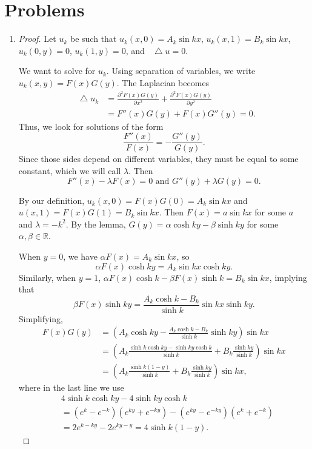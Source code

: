 \documentclass[oneside]{article}
\newcommand*\Laplace{\mathop{}\!\mathbin\bigtriangleup}
\newcommand\bbR{\mathbb{R}}
\begin{document}
  \section{Problems}
  \begin{enumerate}[label=\textbf{\arabic*.}]
    \item
    \begin{proof}
    Let $u_k$ be such that $u_k(x, 0) = A_k\sin kx$, $u_k(x, 1) = B_k\sin kx$,
    $u_k(0, y) = 0$, $u_k(1, y) = 0$, and $\Laplace u = 0$.

    We want to solve for $u_k$. Using separation of variables, we write
    $u_k(x, y) = F(x)G(y)$. The Laplacian becomes \begin{align*}
      \Laplace u_k
      &= \frac{\partial^2F(x)G(y)}{\partial x^2}
         + \frac{\partial^2F(x)G(y)}{\partial y^2} \\
      &= F''(x)G(y) + F(x)G''(y) = 0 \text{.}
    \end{align*} Thus, we look for solutions of the form\[
      \frac{F''(x)}{F(x)} = - \frac{G''(y)}{G(y)} \text{.}
    \] Since those sides depend on different variables, they must be equal to some
    constant, which we will call $\lambda$. Then \[
      F''(x) - \lambda F(x) = 0 \text{ and } G''(y) + \lambda G(y) = 0 \text{.}
    \]

    By our definition, $u_k(x, 0) = F(x)G(0) = A_k\sin kx$ and
    $u(x, 1) = F(x)G(1) = B_k\sin kx$. Then $F(x) = a\sin kx$ for some $a$ and
    $\lambda = -k^2$. By the lemma, $G(y) = \alpha\cosh ky - \beta\sinh ky$ for
    some $\alpha, \beta \in \bbR$.

    When $y = 0$, we have $\alpha F(x) = A_k\sin kx$, so\[
      \alpha F(x)\cosh ky = A_k\sin kx \cosh ky \text{.}
    \] Similarly, when $y=1$,
    $\alpha F(x) \cosh k - \beta F(x) \sinh k = B_k \sin kx$, implying that\[
      \beta F(x) \sinh ky = \frac{A_k \cosh k - B_k}{\sinh k}\sin kx\sinh ky \text{.}
    \] Simplifying,\begin{align*}
      F(x)G(y) &= \left(A_k \cosh ky
                        - \frac{A_k \cosh k - B_k}{\sinh k}\sinh ky\right)\sin kx \\
      &= \left(A_k\frac{\sinh k \cosh ky - \sinh ky\cosh k}{\sinh k} + B_k\frac{\sinh ky}{\sinh k}\right)\sin kx \\
      &= \left(A_k\frac{\sinh k(1-y)}{\sinh k} + B_k\frac{\sinh ky}{\sinh k}\right)
        \sin kx \text{,}
    \end{align*} where in the last line we use \begin{align*}
      &4\sinh k \cosh ky - 4\sinh ky \cosh k \\
      &= \left(e^k-e^{-k}\right)\left(e^{ky}+e^{-ky}\right)
        - \left(e^{ky}-e^{-ky}\right)\left(e^k+e^{-k}\right) \\
      &= 2 e^{k - ky} - 2e^{ky - y} = 4 \sinh k(1-y) \text{.}
    \end{align*}


\end{proof}
\end{enumerate}
\end{document}
